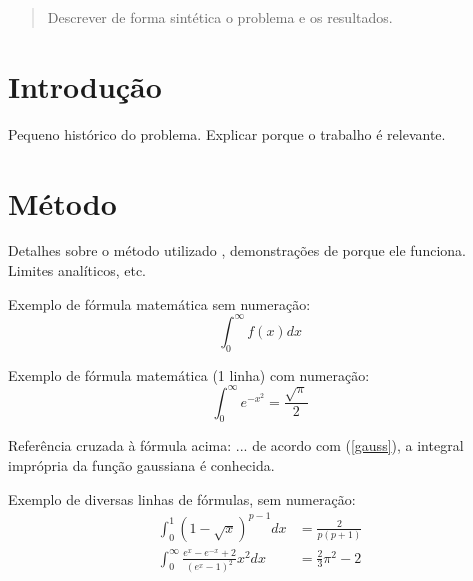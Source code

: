 \maketitle %
\begin{abstract}
Descrever de forma sintética o problema 
e os resultados.
\end{abstract}

\section{Introdu\c{c}\~ao} %
Pequeno histórico do problema. 
Explicar porque o trabalho é relevante.

\section{Método}
Detalhes sobre o método utilizado \cite{Kauffman_book},
demonstrações de porque ele funciona.  Limites analíticos, etc.


Exemplo de fórmula matemática sem numeração:
\[
\int_{0}^{\infty} f(x) dx
\]

Exemplo de fórmula matemática (1 linha) com numeração:
\begin{equation}\label{gauss}
	\int_0^\infty e^{-x^2} = \frac{\sqrt{\pi}}{2}
\end{equation}

Referência cruzada à fórmula acima: ... de acordo com (\ref{gauss}), a integral imprópria da função gaussiana é conhecida.

Exemplo de diversas linhas de fórmulas, sem numeração:
\begin{align*}
	\int_0^1 \left(1-\sqrt{x}\right)^{p-1} dx &= \frac{2}{p(p+1)} \\
	\int_0^\infty \frac{e^x - e^{-x} + 2}{\left(e^x - 1\right)^2} x^2 dx &= \frac{2}{3} \pi^2 - 2
\end{align*}

